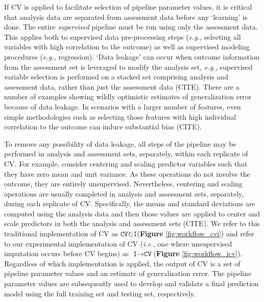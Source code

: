 \documentclass[AMA,STIX1COL,doublespace]{WileyNJD-v2}
\begin{document}
If CV is applied to facilitate selection of pipeline parameter values,
it is critical that analysis data are separated from assessment data
before any `learning' is done. The entire \emph{supervised} pipeline
must be run using only the assessment data. This applies both to
supervised data pre-processing steps (\textit{e.g., }selecting all
variables with high correlation to the outcome) as well as supervised
modeling procedures (\textit{e.g., }regression). `Data leakage' can
occur when outcome information from the assessment set is leveraged to
modify the analysis set, \textit{e.g., }supervised variable selection is
performed on a stacked set comprising analysis and assessment data,
rather than just the assessment data (CITE). There are a number of
examples showing wildly optimistic estimates of generalization error
because of data leakage. In scenarios with a larger number of features,
even simple methodologies such as selecting those features with high
individual correlation to the outcome can induce substantial bias
(CITE).

To remove any possibility of data leakage, all steps of the pipeline may
be performed in analysis and assessment sets, separately, within each
replicate of CV. For example, consider centering and scaling predictor
variables such that they have zero mean and unit variance. As these
operations do not involve the outcome, they are entirely unsupervised.
Nevertheless, centering and scaling operations are usually completed in
analysis and assessment sets, separately, during each replicate of CV.
Specifically, the means and standard deviations are computed using the
analysis data and then those values are applied to center and scale
predictors in both the analysis and assessment sets (CITE). We refer to
this traditional implementation of CV as
$\texttt{CV}\!\circlearrowright\!\texttt{I}$\space (\textbf{Figure}
\ref{fig:workflow_cvi}) and refer to our experimental implementation of
CV (\textit{i.e., }one where unsupervised imputation occurs before CV
begins) as
$\texttt{I}\!\!\rightarrow\!\texttt{CV}$\space (\textbf{Figure}
\ref{fig:workflow_icv}). Regardless of which implementation is applied,
the output of CV is a set of pipeline parameter values and an estimate
of generalization error. The pipeline parameter values are subsequently
used to develop and validate a final prediction model using the full
training set and testing set, respectively.
\end{document}
